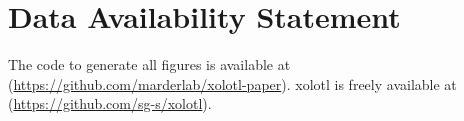 \documentclass{frontiersSCNS} %
\begin{document}
\section*{Data Availability Statement}

The code to generate all figures is available at (\url{https://github.com/marderlab/xolotl-paper}). xolotl is freely available at (\url{https://github.com/sg-s/xolotl}).

%
%
%
%
%
%

\printbibliography

%
%
%
%
%
%



\FloatBarrier

\newpage
\end{document}
